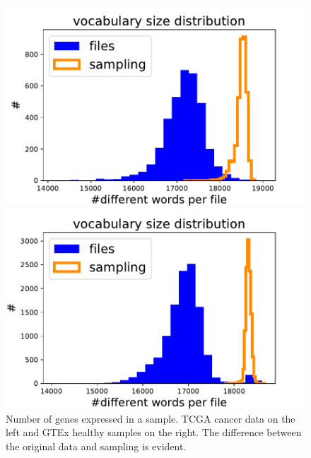 \begin{figure}[htb!]
\begin{minipage}{0.5\textwidth}
    \centering
    \includegraphics[width=0.95\linewidth]{pictures/structure/tcga/diffwordsDistr_null.pdf}
    \end{minipage}
\hspace{2mm}
\begin{minipage}{0.5\textwidth}
    \centering
    \includegraphics[width=0.95\linewidth]{pictures/structure/gtex/diffwordsDistr_null.pdf}
    \end{minipage}
\caption{Number of genes expressed in a sample. TCGA cancer data on the left and GTEx healthy samples on the right. The difference between the original data and sampling is evident.}
\label{fig:structure/diffwordsDistr_null}
\end{figure}